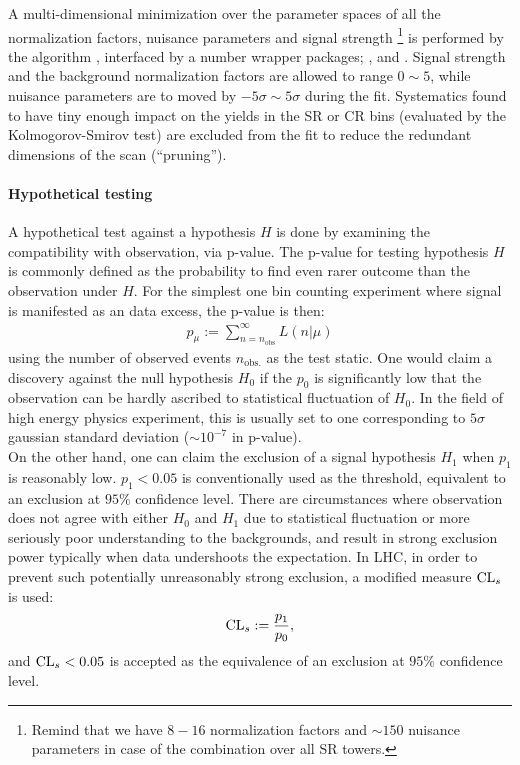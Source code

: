 A multi-dimensional minimization over the parameter spaces of all the normalization factors, nuisance parameters and signal strength 
\footnote{Remind that we have $8-16$ normalization factors and $\sim 150$ nuisance parameters in case of the combination over all SR towers.}
is performed by the  algorithm \cite{minuit2}, 
interfaced by a number wrapper packages;  \cite{HistFitter},  \cite{HistFactory} and  \cite{RooFit}.
Signal strength and the background normalization factors are allowed to range $0\sim5$, while nuisance parameters are to moved by $-5\sigma \sim 5\sigma$ during the fit. 
Systematics found to have tiny enough impact on the yields in the SR or CR bins (evaluated by the Kolmogorov-Smirov test) are excluded from the fit to reduce the redundant dimensions of the scan (``pruning''). \\


\paragraph{Hypothetical testing}
A hypothetical test against a hypothesis $H$ is done by examining the compatibility with observation, via p-value.
The p-value for testing hypothesis $H$ is commonly defined as the probability to find even rarer outcome than the observation under $H$. 
For the simplest one bin counting experiment where signal is manifested as an data excess, the p-value is then:
\begin{align}
p_\mu := \sum_{n=n_{\mathrm{obs}}}^{\infty} L(n|\mu)  \label{eq::poisson_pval}
\end{align}
using the number of observed events $n_{\mathrm{obs.}}$ as the test static.
One would claim a discovery against the null hypothesis $H_0$ if the $p_0$ is significantly low that the observation can be hardly ascribed to statistical fluctuation of $H_0$. In the field of high energy physics experiment, this is usually set to one corresponding to $5\sigma$ gaussian standard deviation ($\sim 10^{-7}$ in p-value). \\

On the other hand, one can claim the exclusion of a signal hypothesis $H_1$ when $p_1$ is reasonably low. $p_1<0.05$ is conventionally used as the threshold, equivalent to an exclusion at $95\%$ confidence level. There are circumstances where observation does not agree with either $H_0$ and $H_1$ due to statistical fluctuation or more seriously poor understanding to the backgrounds, and result in strong exclusion power typically when data undershoots the expectation. In LHC, in order to prevent such potentially unreasonably strong exclusion, a modified measure $\mathrm{CL}_s$ is used:
\begin{align}
\mathrm{CL}_s := \frac{p_1}{p_0},
\end{align}
and $\mathrm{CL}_s<0.05$ is accepted as the equivalence of an exclusion at $95\%$ confidence level. \\

